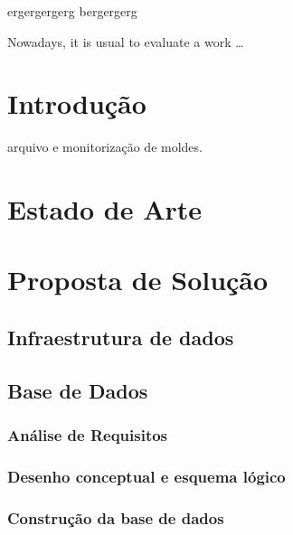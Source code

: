 \documentclass[11pt,twoside,a4paper]{report}
\begin{document}
\TitlePage
  \vspace*{55mm}
       {ergergergerg}
  \TEXT{}
       {bergergerg}
\EndTitlePage
\titlepage\ \endtitlepage %

\TitlePage
  \vspace*{55mm}
       {Nowadays, it is usual to evaluate a work \ldots}
\EndTitlePage
\titlepage\ \endtitlepage %


%
%

\tableofcontents

\cleardoublepage
\listoffigures

\cleardoublepage
\listoftables



\cleardoublepage
{}
\chapter{Introdução}
arquivo e monitorização de moldes.


\cleardoublepage
\chapter{Estado de Arte}

\cleardoublepage
\chapter{Proposta de Solução}
\section{Infraestrutura de dados}

\section{Base de Dados}
\subsection{Análise de Requisitos}

\subsection{Desenho conceptual e esquema lógico}

\subsection{Construção da base de dados}
\end{document}
